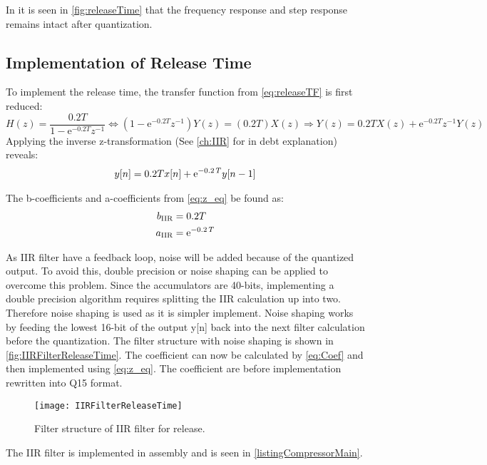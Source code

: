 In it is seen in \autoref{fig:releaseTime} that the frequency response and step response remains intact after quantization.

\subsection*{Implementation of Release Time}

To implement the release time, the transfer function from \autoref{eq:releaseTF} is first reduced:
\begin{equation}
H(z) = \frac{0.2T}{1-\text{e}^{-0.2T} z^{-1}}  \Leftrightarrow (1-\text{e}^{-0.2T} z^{-1})Y(z) = (0.2T)X(z) \Rightarrow Y(z) = 0.2TX(z) + \text{e}^{-0.2T} z^{-1}Y(z)
\end{equation}
Applying the inverse z-transformation (See \autoref{ch:IIR} for in debt explanation) reveals:
\begin{align}
y[n] = 0.2Tx[n] + {\rm e}^{- 0.2\,T}y[n-1]
\label{eq:z_eq}
\end{align}

The b-coefficients and a-coefficients from \autoref{eq:z_eq} be found as:
\begin{align}
b_{\text{IIR}} &= 0.2T \\
a_{\text{IIR}} &= {\rm e}^{- 0.2\,T}
\label{eq:Coef}
\end{align}

As IIR filter have a feedback loop, noise will be added because of the quantized output. To avoid this, double precision or noise shaping can be applied to overcome this problem. Since the accumulators are 40-bits, implementing a double precision algorithm requires splitting the IIR calculation up into two. Therefore noise shaping is used as it is simpler implement. Noise shaping works by feeding the lowest 16-bit of the output y[n] back into the next filter calculation before the quantization. The filter structure with noise shaping is shown in \autoref{fig:IIRFilterReleaseTime}. The coefficient can now be calculated by \autoref{eq:Coef} and then implemented using \autoref{eq:z_eq}. The coefficient are before implementation rewritten into Q15 format.

\begin{figure}[H]
\centering
\texttt{[image: IIRFilterReleaseTime]}
\caption{Filter structure of IIR filter for release.}
\label{fig:IIRFilterReleaseTime}
\end{figure}

The IIR filter is implemented in assembly and is seen in \autoref{listingCompressorMain}. 

